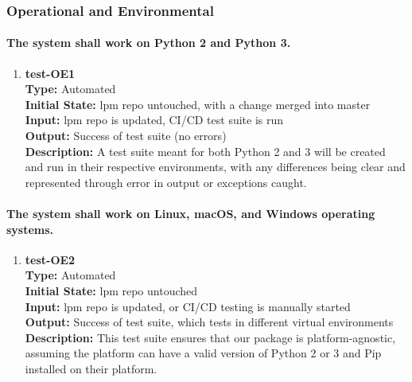 \documentclass[12pt, titlepage]{article}
\begin{document}
\subsubsection{Operational and Environmental}
\paragraph{The system shall work on Python 2 and Python 3.}
\begin{enumerate}
    \item{\textbf{test-OE1}\\}
    \textbf{Type:} Automated\\
    \textbf{Initial State:} lpm repo untouched, with a change merged into master\\
    \textbf{Input:}  lpm repo is updated, CI/CD test suite is run\\
    \textbf{Output:} Success of test suite (no errors)\\
    \textbf{Description:} A test suite meant for both Python 2 and 3 will be created and run in their respective environments, with any differences being clear and represented through error in output or exceptions caught.\\
\end{enumerate}

\paragraph{The system shall work on Linux, macOS, and Windows operating systems.}
\begin{enumerate}
    \item{\textbf{test-OE2}\\}
    \textbf{Type:} Automated\\
    \textbf{Initial State:} lpm repo untouched\\
    \textbf{Input:} lpm repo is updated, or CI/CD testing is manually started\\
    \textbf{Output:} Success of test suite, which tests in different virtual environments\\
    \textbf{Description:} This test suite ensures that our package is platform-agnostic, assuming the platform can have a valid version of Python 2 or 3 and Pip installed on their platform.\\
\end{enumerate}
\end{document}
